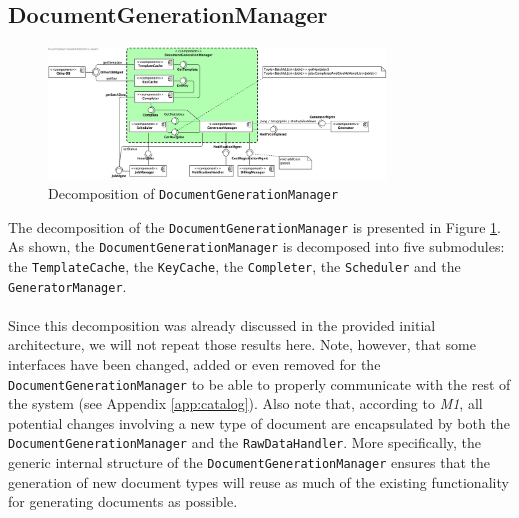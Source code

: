 \documentclass[a4paper,10pt]{article}
\begin{document}
\subsection{DocumentGenerationManager}\label{subsec:decomp-DocumentGenerationManager}
\begin{figure}[!htp]
	\centering
	\includegraphics[width=0.8\textwidth]{DocumentGenerationManager.png}
	\caption{Decomposition of \texttt{DocumentGenerationManager}}
	\label{fig:decomp-DocumentGenerationManager}
\end{figure}
\FloatBarrier
\noindent
The decomposition of the \texttt{DocumentGenerationManager} is presented in Figure \ref{fig:decomp-DocumentGenerationManager}. As shown, the \texttt{DocumentGenerationManager} is decomposed into five submodules: the \texttt{TemplateCache}, the \texttt{KeyCache}, the \texttt{Completer}, the \texttt{Scheduler} and the \texttt{GeneratorManager}.\\\\
Since this decomposition was already discussed in the provided initial architecture, we will not repeat those results here. Note, however, that some interfaces have been changed, added or even removed for the \texttt{DocumentGenerationManager} to be able to properly communicate with the rest of the system (see Appendix \ref{app:catalog}).
Also note that, according to \textit{M1}, all potential changes involving a new type of document are encapsulated by both the \texttt{DocumentGenerationManager} and the \texttt{RawDataHandler}. More specifically, the generic internal structure of the \texttt{DocumentGenerationManager} ensures that the generation of new document types will reuse as much of the existing functionality for generating documents as possible.
\end{document}
